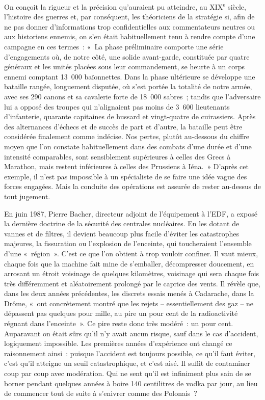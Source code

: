 \documentclass[french,twoside]{book} %
\begin{document}
On conçoit la rigueur et la précision qu’auraient pu atteindre, au \textsc{XIX}\textsuperscript{e} siècle, l’histoire des guerres et, par conséquent, les théoriciens de la stratégie si, afin de ne pas donner d’informations trop confidentielles aux commentateurs neutres ou aux historiens ennemis, on s’en était habituellement tenu à rendre compte d’une campagne en ces termes : « La phase préliminaire comporte une série d’engagements où, de notre côté, une solide avant-garde, constituée par quatre généraux et les unités placées sous leur commandement, se heurte à un corps ennemi comptant 13 000 baïonnettes. Dans la phase ultérieure se développe une bataille rangée, longuement disputée, où s’est portée la totalité de notre armée, avec ses 290 canons et sa cavalerie forte de 18 000 sabres ; tandis que l’adversaire lui a opposé des troupes qui n’alignaient pas moins de 3 600 lieutenants d’infanterie, quarante capitaines de hussard et vingt-quatre de cuirassiers. Après des alternances d’échecs et de succès de part et d’autre, la bataille peut être considérée finalement comme indécise. Nos pertes, plutôt au-dessous du chiffre moyen que l’on constate habituellement dans des combats d’une durée et d’une intensité comparables, sont sensiblement supérieures à celles des Grecs à Marathon, mais restent inférieures à celles des Prussiens à Iéna. » D’après cet exemple, il n’est pas impossible à un spécialiste de se faire une idée vague des forces engagées. Mais la conduite des opérations est assurée de rester au-dessus de tout jugement.\par
En juin 1987, Pierre Bacher, directeur adjoint de l’équipement à l’EDF, a exposé la dernière doctrine de la sécurité des centrales nucléaires. En les dotant de vannes et de filtres, il devient beaucoup plus facile d’éviter les catastrophes majeures, la fissuration ou l’explosion de l’enceinte, qui toucheraient l’ensemble d’une « région ». C’est ce que l’on obtient à trop vouloir confiner. Il vaut mieux, chaque fois que la machine fait mine de s’emballer, décompresser doucement, en arrosant un étroit voisinage de quelques kilomètres, voisinage qui sera chaque fois très différemment et aléatoirement prolongé par le caprice des vents. Il révèle que, dans les deux années précédentes, les discrets essais menés à Cadarache, dans la Drôme, « ont concrètement montré que les rejets – essentiellement des gaz – ne dépassent pas quelques pour mille, au pire un pour cent de la radioactivité régnant dans l’enceinte ». Ce pire reste donc très modéré : un pour cent. Auparavant on était sûrs qu’il n’y avait aucun risque, sauf dans le cas d’accident, logiquement impossible. Les premières années d’expérience ont changé ce raisonnement ainsi : puisque l’accident est toujours possible, ce qu’il faut éviter, c’est qu’il atteigne un seuil catastrophique, et c’est aisé. Il suffit de contaminer coup par coup avec modération. Qui ne sent qu’il est infiniment plus sain de se borner pendant quelques années à boire 140 centilitres de vodka par jour, au lieu de commencer tout de suite à s’enivrer comme des Polonais ?\par
\end{document}

